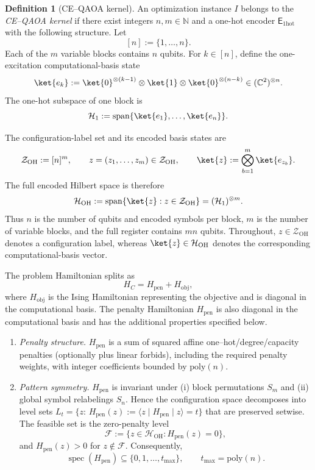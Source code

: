 \documentclass[a4paper,unpublished,onecolumn,11pt]{quantumarticle}
\theoremstyle{definition}
\newtheorem{definition}[theorem]{Definition}
\theoremstyle{remark}
\newcommand{\OH}{\mathcal{H}_{\mathrm{OH}}}
\newcommand{\ZOH}{\mathcal Z_{\mathrm{OH}}}
\begin{document}
\begin{definition}[CE--QAOA kernel]
\label{def:kernel-requirement}
An optimization instance \(I\) belongs to the \emph{CE--QAOA kernel}
if there exist integers \(n,m\in\mathbb N\) and a one-hot encoder
\(\mathsf E_{\mathrm{1hot}}\) with the following structure. Let
\[
[n]:=\{1,\ldots,n\}.
\]
Each of the \(m\) variable blocks contains \(n\) qubits. For
\(k\in[n]\), define the one-excitation computational-basis state
\[
\ket{e_k}
:=
\ket{0}^{\otimes(k-1)}
\otimes
\ket{1}
\otimes
\ket{0}^{\otimes(n-k)}
\in
(\mathbb C^2)^{\otimes n}.
\]
The one-hot subspace of one block is
\[
\mathcal H_1
:=
\operatorname{span}
\{\ket{e_1},\ldots,\ket{e_n}\}.
\]

The configuration-label set and its encoded basis states are
\[
\ZOH
:=
[n]^m,
\qquad
z=(z_1,\ldots,z_m)\in\ZOH,
\qquad
\ket{z}
:=
\bigotimes_{b=1}^{m}\ket{e_{z_b}}.
\]
The full encoded Hilbert space is therefore
\[
\OH
:=
\operatorname{span}
\{\ket{z}:z\in\ZOH\}
=
(\mathcal H_1)^{\otimes m}.
\]
Thus \(n\) is the number of qubits and encoded symbols per block,
\(m\) is the number of variable blocks, and the full register contains
\(mn\) qubits. Throughout, \(z\in\ZOH\) denotes a
configuration label, whereas \(\ket{z}\in\OH\) denotes the
corresponding computational-basis vector.

The problem Hamiltonian splits as
\[
H_C
=
H_{\mathrm{pen}}
+
H_{\mathrm{obj}},
\]
where \(H_{\mathrm{obj}}\) is the Ising Hamiltonian representing the
objective and is diagonal in the computational basis.
The penalty Hamiltonian \(H_{\mathrm{pen}}\) is also diagonal in the
computational basis and has the additional properties specified below.

\begin{enumerate}[label=\textup{(\alph*)}, leftmargin=2.2em]
\item \emph{Penalty structure.}
      $H_{\mathrm{pen}}$ is a sum of squared affine
      one--hot/degree/capacity penalties (optionally plus linear
      forbids), including the required penalty weights, with integer
      coefficients bounded by $\mathrm{poly}(n)$. 
      

\item \emph{Pattern symmetry.} $H_{\mathrm{pen}}$ is invariant under
      (i) block permutations $S_m$ and (ii) global symbol relabelings $S_n$. Hence the configuration space decomposes into level sets
      $L_t=\{z:\, H_{\mathrm{pen}}(z) :=\langle z \mid H_{\mathrm{pen}} \mid z\rangle=t\}$ that are preserved setwise.       The feasible set is
      the zero-penalty level
      \[
      \mathcal F
      :=
      \{z\in\mathcal H_{\mathrm{OH}}:
      H_{\mathrm{pen}}(z)=0\},
      \]
      and $H_{\mathrm{pen}}(z)>0$ for
      $z\notin\mathcal F$. Consequently,
      \[
      \operatorname{spec}(H_{\mathrm{pen}})
      \subseteq
      \{0,1,\ldots,t_{\max}\},
      \qquad
      t_{\max}=\mathrm{poly}(n).
      \]


\end{enumerate}
\end{definition}
\end{document}
